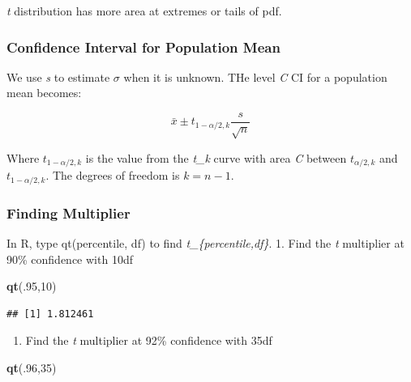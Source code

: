 \documentclass[
  openany]{book}
\newenvironment{Shaded}{\begin{snugshade}}{\end{snugshade}}
\newcommand{\DecValTok}[1]{\textcolor[rgb]{0.00,0.00,0.81}{#1}}
\newcommand{\FunctionTok}[1]{\textcolor[rgb]{0.13,0.29,0.53}{\textbf{#1}}}
\newcommand{\NormalTok}[1]{#1}
\providecommand{\tightlist}{%
  \setlength{\itemsep}{0pt}\setlength{\parskip}{0pt}}
\begin{document}
\emph{t} distribution has more area at extremes or tails of pdf.

\subsubsection{Confidence Interval for Population Mean}\label{confidence-interval-for-population-mean-1}

We use \emph{s} to estimate \(\sigma\) when it is unknown. THe level \emph{C} CI for a population mean becomes:

\begin{equation}
\bar{x}\pm t_{1-\alpha/2,k}\frac{s}{\sqrt{n}}
\label{eq:ciestimate}
\end{equation}

Where \(t_{1-\alpha/2,k}\) is the value from the \emph{t\_k} curve with area \emph{C} between \(t_{\alpha/2,k}\) and \(t_{1-\alpha/2,k}\). The degrees of freedom is \(k=n-1\).

\subsubsection{Finding Multiplier}\label{finding-multiplier}

In R, type qt(percentile, df) to find \emph{t\_\{percentile,df\}}. 1. Find the \emph{t} multiplier at 90\% confidence with 10df

\begin{Shaded}
\begin{Highlighting}[]
\FunctionTok{qt}\NormalTok{(.}\DecValTok{95}\NormalTok{,}\DecValTok{10}\NormalTok{)}
\end{Highlighting}
\end{Shaded}

\begin{verbatim}
## [1] 1.812461
\end{verbatim}

\begin{enumerate}
\def\labelenumi{\arabic{enumi}.}
\setcounter{enumi}{1}
\tightlist
\item
  Find the \emph{t} multiplier at 92\% confidence with 35df
\end{enumerate}

\begin{Shaded}
\begin{Highlighting}[]
\FunctionTok{qt}\NormalTok{(.}\DecValTok{96}\NormalTok{,}\DecValTok{35}\NormalTok{)}
\end{Highlighting}
\end{Shaded}
\end{document}
